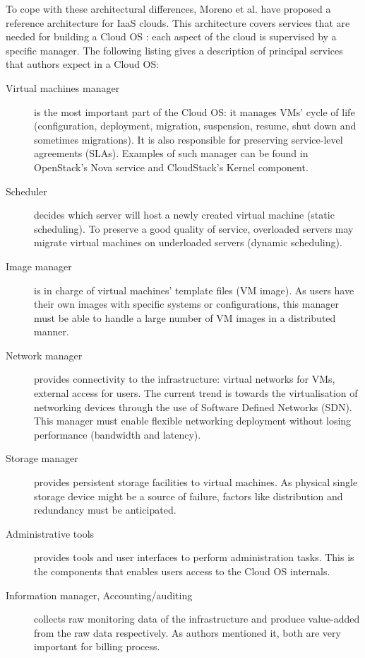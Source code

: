 To cope with these architectural differences, Moreno et al. have proposed a 
reference architecture \cite{moreno2012iaas} for IaaS clouds. This architecture 
covers services that are needed for building a Cloud OS : each aspect of the 
cloud is supervised by a specific manager. The following listing gives a 
description of principal services that authors expect in a Cloud OS:
\begin{description}
	
	\item [Virtual machines manager] is the most important part of the Cloud OS:
	it manages VMs' cycle of life (configuration, deployment, 
	migration, suspension, resume, shut down and sometimes migrations). It is 
	also responsible for preserving service-level agreements (SLAs). Examples of
	such manager can be found in OpenStack's Nova service and CloudStack's 
	Kernel component.

	\item [Scheduler] decides which server will host a newly created virtual 
	machine (static scheduling). To preserve a good quality of service, 
	overloaded servers may migrate virtual machines on underloaded servers 
	(dynamic scheduling).

	\item [Image manager] is in charge of virtual machines' template files (VM 
	image). As users have their own images with specific systems or 
	configurations, this manager must be able to handle a large number of VM
	images in a distributed manner.

	\item [Network manager] provides connectivity to the infrastructure: virtual
	networks for VMs, external access for users. The current trend is towards 
	the	virtualisation of networking devices through the use of Software
	Defined Networks (SDN). This manager must enable flexible networking 
	deployment without losing performance (bandwidth and latency).

	\item [Storage manager] provides persistent storage facilities to virtual 
	machines. As physical single storage device might be a source of failure,
	factors like distribution and redundancy must be anticipated.

	\item [Administrative tools] provides tools and user interfaces to perform
	administration tasks. This is the components that enables users access to
	the Cloud OS internals.

	\item [Information manager, Accounting/auditing ] collects raw monitoring 
	data of the infrastructure and produce value-added from the raw data 
	respectively. As authors mentioned it, both are very important for billing
	process.

\end{description}

